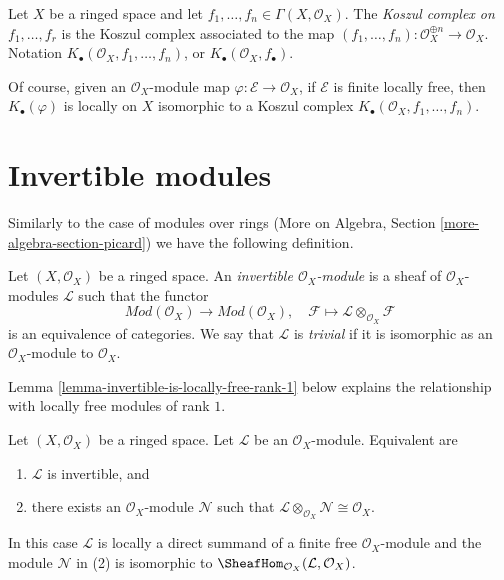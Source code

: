 \begin{definition}
\label{definition-koszul-complex}
Let $X$ be a ringed space and let
$f_1, \ldots, f_n \in \Gamma(X, \mathcal{O}_X)$. The
{\it Koszul complex on $f_1, \ldots, f_r$} is the Koszul complex
associated to the map
$(f_1, \ldots, f_n) : \mathcal{O}_X^{\oplus n} \to \mathcal{O}_X$.
Notation $K_\bullet(\mathcal{O}_X, f_1, \ldots, f_n)$,
or $K_\bullet(\mathcal{O}_X, f_\bullet)$.
\end{definition}

\noindent
Of course, given an $\mathcal{O}_X$-module map
$\varphi : \mathcal{E} \to \mathcal{O}_X$,
if $\mathcal{E}$ is finite locally free, then
$K_\bullet(\varphi)$ is locally on $X$ isomorphic to a Koszul complex
$K_\bullet(\mathcal{O}_X, f_1, \ldots, f_n)$.



\section{Invertible modules}
\label{section-invertible}

\noindent
Similarly to the case of modules over rings
(More on Algebra, Section \ref{more-algebra-section-picard})
we have the following definition.

\begin{definition}
\label{definition-invertible}
Let $(X, \mathcal{O}_X)$ be a ringed space. An
{\it invertible $\mathcal{O}_X$-module} is a sheaf
of $\mathcal{O}_X$-modules $\mathcal{L}$ such that
the functor
$$
\textit{Mod}(\mathcal{O}_X) \longrightarrow \textit{Mod}(\mathcal{O}_X),\quad
\mathcal{F} \longmapsto \mathcal{L} \otimes_{\mathcal{O}_X} \mathcal{F}
$$
is an equivalence of categories. We say that $\mathcal{L}$ is
{\it trivial} if it is isomorphic as an $\mathcal{O}_X$-module
to $\mathcal{O}_X$.
\end{definition}

\noindent
Lemma \ref{lemma-invertible-is-locally-free-rank-1}
below explains the relationship with locally free modules
of rank $1$.

\begin{lemma}
\label{lemma-invertible}
Let $(X, \mathcal{O}_X)$ be a ringed space. Let $\mathcal{L}$
be an $\mathcal{O}_X$-module. Equivalent are
\begin{enumerate}
\item $\mathcal{L}$ is invertible, and
\item there exists an $\mathcal{O}_X$-module $\mathcal{N}$
such that
$\mathcal{L} \otimes_{\mathcal{O}_X} \mathcal{N} \cong \mathcal{O}_X$.
\end{enumerate}
In this case $\mathcal{L}$ is locally a direct summand of a finite free
$\mathcal{O}_X$-module and the module $\mathcal{N}$ in (2) is isomorphic to
$\SheafHom_{\mathcal{O}_X}(\mathcal{L}, \mathcal{O}_X)$.
\end{lemma}

